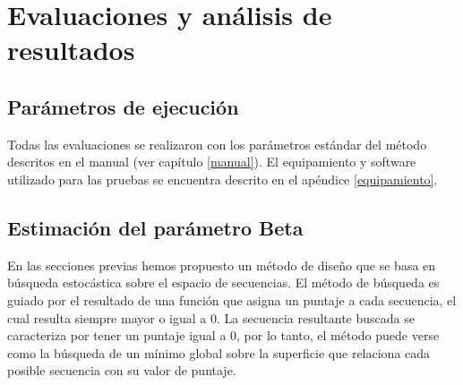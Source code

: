 \chapter{Evaluaciones y análisis de resultados}
\label{results}

\section{Parámetros de ejecución}

Todas las evaluaciones se realizaron con los parámetros estándar del método descritos en el manual (ver capítulo \ref{manual}).
El equipamiento y software utilizado para las pruebas se encuentra descrito en el apéndice \ref{equipamiento}.

\section{Estimación del parámetro Beta}\label{betaResults}

En las secciones previas hemos propuesto un método de diseño que se basa en búsqueda estocástica sobre el espacio de secuencias.
El método de búsqueda es guiado por el resultado de una función que asigna un puntaje a cada secuencia, el cual resulta siempre mayor o igual a 0.
La secuencia resultante buscada se caracteriza por tener un puntaje igual a 0, por lo tanto, el método puede verse como la búsqueda de un mínimo global sobre la superficie
que relaciona cada posible secuencia con su valor de puntaje.

